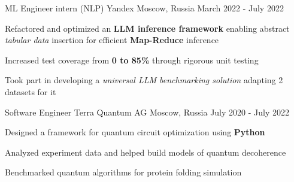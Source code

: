 
\begin{cventries}
  \cventry
    {ML Engineer intern (NLP)}
    {Yandex}
    {Moscow, Russia}
    {March 2022 - July 2022}
    {
      \begin{cvitems} %
        \item {Refactored and optimized an \textbf{LLM inference framework} 
        enabling abstract \textit{tabular data} insertion for efficient \textbf{Map-Reduce} inference}
        \item {Increased test coverage from \textbf{0 to 85\%} through rigorous unit testing}
        \item {Took part in developing a \textit{universal LLM benchmarking solution} adapting 2 datasets for it}
      \end{cvitems}
    }
    
  \cventry
    {Software Engineer} %
    {Terra Quantum AG} %
    {Moscow, Russia} %
    {July 2020 - July 2022} %
    {
      \begin{cvitems} %
        \item {Designed a framework for quantum circuit optimization using \textbf{Python}}
        \item {Analyzed experiment data and helped build models of quantum decoherence}
        \item {Benchmarked quantum algorithms for protein folding simulation}
      \end{cvitems}
    }
    
\end{cventries}
